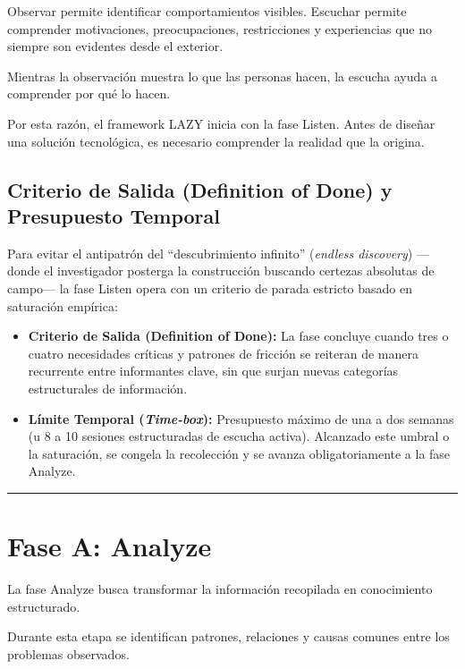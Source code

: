 \documentclass[14pt,a4paper,oneside]{extbook}
\begin{document}
Observar permite identificar comportamientos visibles. Escuchar permite comprender motivaciones, preocupaciones, restricciones y experiencias que no siempre son evidentes desde el exterior.

Mientras la observación muestra lo que las personas hacen, la escucha ayuda a comprender por qué lo hacen.

Por esta razón, el framework LAZY inicia con la fase Listen. Antes de diseñar una solución tecnológica, es necesario comprender la realidad que la origina.

\subsection{Criterio de Salida (Definition of Done) y Presupuesto Temporal}

Para evitar el antipatrón del \enquote{descubrimiento infinito} (\textit{endless discovery}) ---donde el investigador posterga la construcción buscando certezas absolutas de campo--- la fase Listen opera con un criterio de parada estricto basado en saturación empírica:

\begin{itemize}
\item \textbf{Criterio de Salida (Definition of Done):} La fase concluye cuando tres o cuatro necesidades críticas y patrones de fricción se reiteran de manera recurrente entre informantes clave, sin que surjan nuevas categorías estructurales de información.
\item \textbf{Límite Temporal (\textit{Time-box}):} Presupuesto máximo de una a dos semanas (u 8 a 10 sesiones estructuradas de escucha activa). Alcanzado este umbral o la saturación, se congela la recolección y se avanza obligatoriamente a la fase Analyze.
\end{itemize}

\par\vspace{1.5em}\noindent\hfill\rule{0.25\textwidth}{0.6pt}\hfill\par\vspace{1.5em}

\section{Fase A: Analyze}

La fase Analyze busca transformar la información recopilada en conocimiento estructurado.

Durante esta etapa se identifican patrones, relaciones y causas comunes entre los problemas observados.
\end{document}
